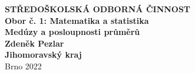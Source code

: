 \documentclass[12pt]{report}
\begin{document}
\newcommand{\ZZ}{{\mathbb{Z}}}
\newcommand{\cyc}[1]{{\langle #1 \rangle}}


\newtheorem{veta}{Věta}[section]


\theoremstyle{de}
\newtheorem{de}{Definition}[section]
\newtheorem{dusledek}[veta]{Důsledek}
\newtheorem{lemma}[veta]{Lemma}
\newtheorem*{lemma*}{Lemma}

\theoremstyle{definition}
\newtheorem{priklad}[veta]{Příklad}
\newtheorem{definice}[veta]{Definice}
\newtheorem{problem}[veta]{Problém}
\newtheorem{znaceni}[veta]{Značení}
\newtheorem*{umluva}{Úmluva}
\newtheorem*{poznamka}{Poznámka}
\newtheorem{dfn}[veta]{Definition}



\setlength{\parindent}{2ex}

\def\Tr{\operatorname{Tr}}
\def\N{\operatorname{N}}
\def\SL{\operatorname{SL}}
\def\nsd{\operatorname{nsd}}
\def\End{\operatorname{End}}
\def\id{\operatorname{id}}
\def\char{\operatorname{char}}
\def\ker{\operatorname{ker}}
\def\Aut{\operatorname{Aut}}
\def\Gal{\operatorname{Gal}}
\def\Fix{\operatorname{Fix}}
\def\c{\operatorname{\mathbb{C}}}
\def\R{\operatorname{\mathbb{R}}}
\def\q{\operatorname{\mathbb{Q}}}
\def\e{\operatorname{\mathcal{V}}}
\def\z{\operatorname{\mathbb{Z}}}
\def\n{\operatorname{\mathbb{N}}}
\def\s{\operatorname{\subseteq}}
\def\w{\operatorname{\zeta}}
\def\fii{\operatorname{\varphi}}
\def\o{\operatorname{\mathcal{O}}}
\def\I{\operatorname{\mathcal{I}}}
\def\J{\operatorname{\mathcal{J}}}
\def\P{\operatorname{\mathcal{P}}}
\def\pn{\operatorname{\mathfrak{P}}}
\def\pn{\operatorname{\mathfrak{p}}}
\def\res{\operatorname{res}}
\def\ord{\operatorname{ord}}
\def\AG{\operatorname{AG}}
\setlength{\emergencystretch}{3em}


\begin{titlepage}
{
\centering
\LARGE \textbf{STŘEDOŠKOLSKÁ ODBORNÁ ČINNOST}\\
\Large\textbf{Obor č. 1: Matematika a statistika}\\
\vspace{6cm}
\LARGE\textbf{Medúzy a posloupnosti průměrů}\\
}
\vspace{10cm}
{\noindent\large\bfseries Zdeněk Pezlar\\ 
	\large\bfseries Jihomoravský kraj\\ }
\center\large Brno 2022
	
\end{titlepage}
\end{document}
